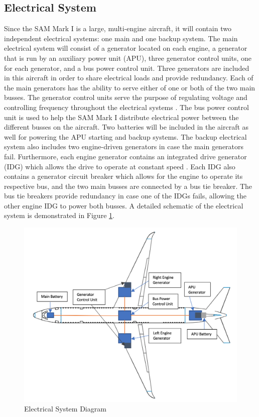 \subsection{Electrical System}
Since the SAM Mark I is a large, multi-engine aircraft, it will contain two independent electrical systems: one main and one backup system. The main electrical system will consist of a generator located on each engine, a generator that is run by an auxiliary power unit (APU), three generator control units, one for each generator, and a bus power control unit. Three generators are included in this aircraft in order to share electrical loads and provide redundancy. Each of the main generators has the ability to serve either of one or both of the two main busses. The generator control units serve the purpose of regulating voltage and controlling frequency throughout the electrical systems \cite{electrical_system}. The bus power control unit is used to help the SAM Mark I distribute electrical power between the different busses on the aircraft. Two batteries will be included in the aircraft as well for powering the APU starting and backup systems. The backup electrical system also includes two engine-driven generators in case the main generators fail. Furthermore, each engine generator contains an integrated drive generator (IDG) which allows the drive to operate at constant speed \cite{electrical_system}. Each IDG also contains a generator circuit breaker which allows for the engine to operate its respective bus, and the two main busses are connected by a bus tie breaker. The bus tie breakers provide redundancy in case one of the IDGs fails, allowing the other engine IDG to power both busses. A detailed schematic of the electrical system is demonstrated in Figure \ref{electrical_system}. 

\begin{figure}[H]
    \centering
    \includegraphics[width=.75\linewidth]{Photos/systems/electrical_system.png}
    \caption{Electrical System Diagram}
    \label{electrical_system}
\end{figure}


